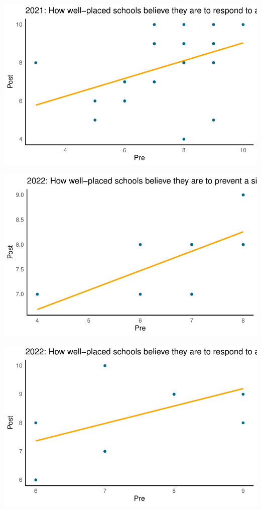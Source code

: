 \documentclass[
  letterpaper,
  DIV=11,
  numbers=noendperiod]{scrartcl}
\begin{document}
\includegraphics{report_files/figure-pdf/unnamed-chunk-20-2.pdf}

\includegraphics{report_files/figure-pdf/unnamed-chunk-20-3.pdf}

\includegraphics{report_files/figure-pdf/unnamed-chunk-20-4.pdf}
\end{document}
